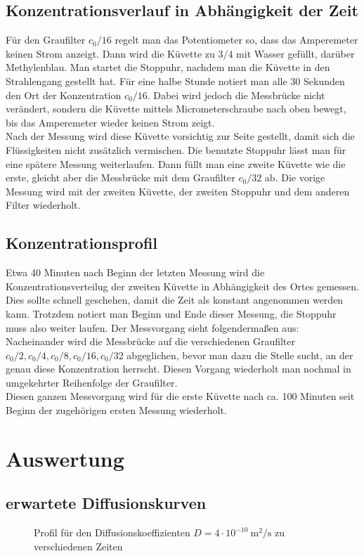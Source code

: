 \documentclass[12pt,a4paper,titlepage,headinclude,bibtotoc]{scrartcl}
\begin{document}
\subsection{Konzentrationsverlauf in Abhängigkeit der Zeit}
Für den Graufilter $c_0/16$ regelt man das Potentiometer so, dass das Amperemeter keinen Strom anzeigt.
Dann wird die Küvette zu $3/4$ mit Wasser gefüllt, darüber Methylenblau.
Man startet die Stoppuhr, nachdem man die Küvette in den Strahlengang gestellt hat.
Für eine halbe Stunde notiert man alle 30 Sekunden den Ort der Konzentration $c_0/16$.
Dabei wird jedoch die Messbrücke nicht verändert, sondern die Küvette mittels Micrometerschraube nach oben bewegt, bis das Amperemeter wieder keinen Strom zeigt.\\
Nach der Messung wird diese Küvette vorsichtig zur Seite gestellt, damit sich die Flüssigkeiten nicht zusätzlich vermischen.
Die benutzte Stoppuhr lässt man für eine spätere Messung weiterlaufen.
Dann füllt man eine zweite Küvette wie die erste, gleicht aber die Messbrücke mit dem Graufilter $c_0/32$ ab.
Die vorige Messung wird mit der zweiten Küvette, der zweiten Stoppuhr und dem anderen Filter wiederholt.
\subsection{Konzentrationsprofil}
Etwa 40 Minuten nach Beginn der letzten Messung wird die Konzentrationsverteilug der zweiten Küvette in Abhängigkeit des Ortes gemessen.
Dies sollte schnell geschehen, damit die Zeit als konstant angenommen werden kann.
Trotzdem notiert man Beginn und Ende dieser Messung, die Stoppuhr muss also weiter laufen.
Der Messvorgang sieht folgendermaßen aus:
Nacheinander wird die Messbrücke auf die verschiedenen Graufilter $c_0/2, c_0/4, c_0/8, c_0/16, c_0/32$ abgeglichen, bevor man dazu die Stelle sucht, an der genau diese Konzentration herrscht.
Diesen Vorgang wiederholt man nochmal in umgekehrter Reihenfolge der Graufilter.\\
Diesen ganzen Messvorgang wird für die erste Küvette nach ca. 100 Minuten  seit Beginn der zugehörigen ersten Messung wiederholt. 

\section{Auswertung}
\label{sec:auswertung}

\subsection{erwartete Diffusionskurven}
\begin{figure}
	
	\caption{Profil für den Diffusionskoeffizienten $D=4\cdot 10^{-10} ~ \si{\meter ^2 / \second}$ zu verschiedenen Zeiten}
	\label{fig:erwDiffKurve}
\end{figure}
\end{document}
